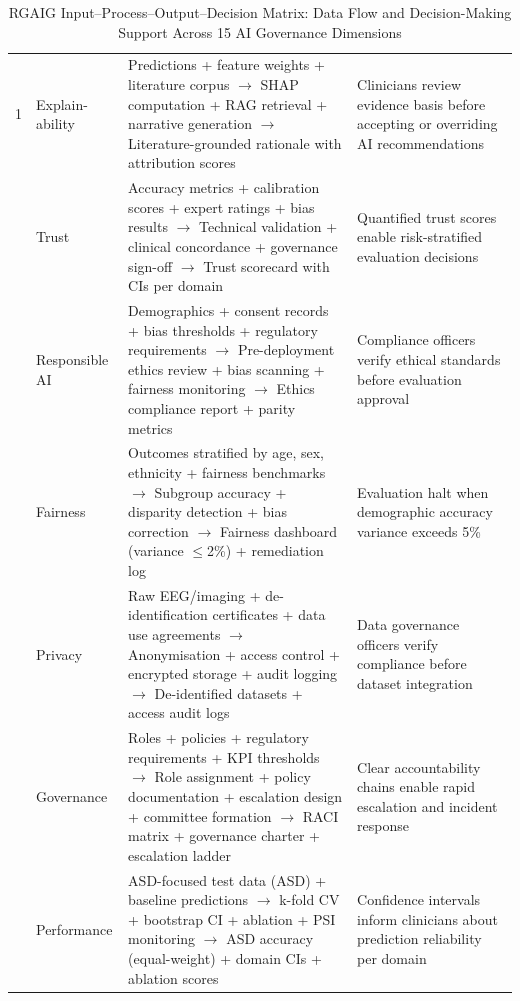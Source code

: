 \begin{table}[!htbp]
\tablestripes
\tablefontsize
\caption[RGAIG Input--Process--Output--Decision Matrix]{RGAIG Input--Process--Output--Decision Matrix: Data Flow and Decision-Making Support Across 15 AI Governance Dimensions}
\begin{tabularx}{\textwidth}{@{} p{0.4cm} p{1.5cm} L L @{}}
\toprule
\thead{\#} &  &  &  \\
 & Explain-ability & Predictions + feature weights + literature corpus $\to$ SHAP computation + RAG retrieval + narrative generation $\to$ Literature-grounded rationale with attribution scores & Clinicians review evidence basis before accepting or overriding AI recommendations \\
 & Trust & Accuracy metrics + calibration scores + expert ratings + bias results $\to$ Technical validation + clinical concordance + governance sign-off $\to$ Trust scorecard with CIs per domain & Quantified trust scores enable risk-stratified evaluation decisions \\
 & Responsible AI & Demographics + consent records + bias thresholds + regulatory requirements $\to$ Pre-deployment ethics review + bias scanning + fairness monitoring $\to$ Ethics compliance report + parity metrics & Compliance officers verify ethical standards before evaluation approval \\
 & Fairness & Outcomes stratified by age, sex, ethnicity + fairness benchmarks $\to$ Subgroup accuracy + disparity detection + bias correction $\to$ Fairness dashboard (variance $\leq$2\%) + remediation log & Evaluation halt when demographic accuracy variance exceeds 5\% \\
 & Privacy & Raw EEG/imaging + de-identification certificates + data use agreements $\to$ Anonymisation + access control + encrypted storage + audit logging $\to$ De-identified datasets + access audit logs & Data governance officers verify compliance before dataset integration \\
 & Governance & Roles + policies + regulatory requirements + KPI thresholds $\to$ Role assignment + policy documentation + escalation design + committee formation $\to$ RACI matrix + governance charter + escalation ladder & Clear accountability chains enable rapid escalation and incident response \\
 & Performance & ASD-focused test data (ASD) + baseline predictions $\to$ k-fold CV + bootstrap CI + ablation + PSI monitoring $\to$ ASD accuracy (equal-weight) \asdacc{} + domain CIs + ablation scores & Confidence intervals inform clinicians about prediction reliability per domain \\

\end{tabularx}
\end{table}
